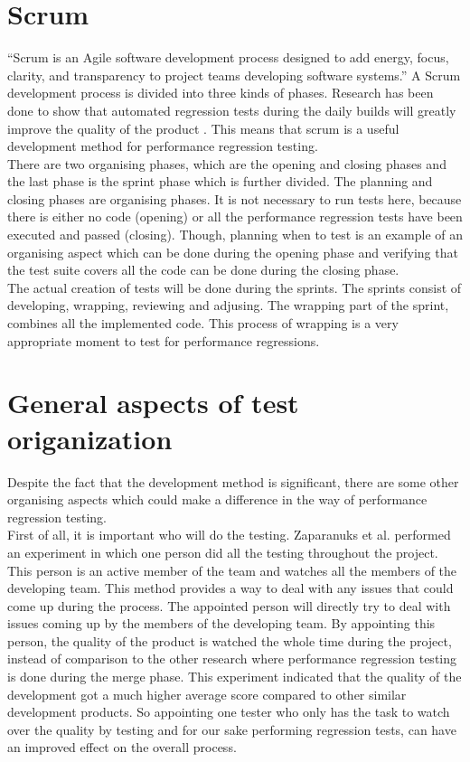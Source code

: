 \section{Scrum}
``Scrum is an Agile software development process designed to add energy, focus, clarity, and transparency to project teams developing software systems.''\cite{sutherland2007distributed} A Scrum development process is divided into three kinds of phases. Research has been done to show that automated regression tests during the daily builds will greatly improve the quality of the product \cite{Future_of_Scrum}. This means that scrum is a useful development method for performance regression testing. \\ There are two organising phases, which are the opening and closing phases and the last phase is the sprint phase which is further divided. The planning and closing phases are organising phases. It is not necessary to run tests here, because there is either no code (opening) or all the performance regression tests have been executed and passed (closing). Though, planning when to test is an example of an organising aspect which can be done during the opening phase and verifying that the test suite covers all the code can be done during the closing phase. \\ The actual creation of tests will be done during the sprints. The sprints consist of developing, wrapping, reviewing and adjusing. The wrapping part of the sprint, combines all the implemented code. This process of wrapping is a very appropriate moment to test for performance regressions. \\

\section{General aspects of test origanization}
Despite the fact that the development method is significant, there are some other organising aspects which could make a difference in the way of performance regression testing. \\
First of all, it is important who will do the testing. Zaparanuks et al. performed an experiment in which one person did all the testing throughout the project. \cite{sutherland2009fully} This person is an active member of the team and watches all the members of the developing team. This method provides a way to deal with any issues that could come up during the process. The appointed person will directly try to deal with issues coming up by the members of the developing team. By appointing this person, the quality of the product is watched the whole time during the project, instead of comparison to the other research where performance regression testing is done during the merge phase. This experiment indicated that the quality of the development got a much higher average score compared to other similar development products. So appointing one tester who only has the task to watch over the quality by testing and for our sake performing regression tests, can have an improved effect on the overall process. \\

